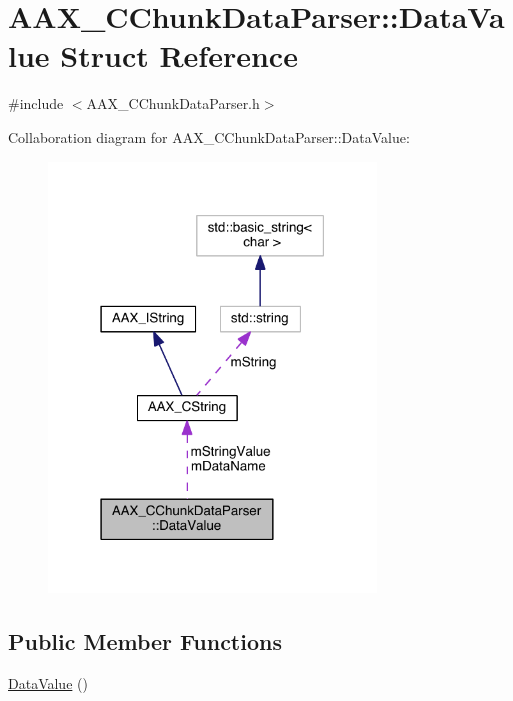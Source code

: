 \hypertarget{a00144}{}\section{A\+A\+X\+\_\+\+C\+Chunk\+Data\+Parser\+:\+:Data\+Value Struct Reference}
\label{a00144}


{\ttfamily \#include $<$A\+A\+X\+\_\+\+C\+Chunk\+Data\+Parser.\+h$>$}



Collaboration diagram for A\+A\+X\+\_\+\+C\+Chunk\+Data\+Parser\+:\+:Data\+Value\+:
\nopagebreak
\begin{figure}[H]
\begin{center}
\leavevmode
\includegraphics[width=247pt]{a00406}
\end{center}
\end{figure}
\subsection*{Public Member Functions}
\begin{DoxyCompactItemize}
\item 
\hyperlink{a00144_a987366216b93c23f40b8b040412ee2dd}{Data\+Value} ()
\end{DoxyCompactItemize}
